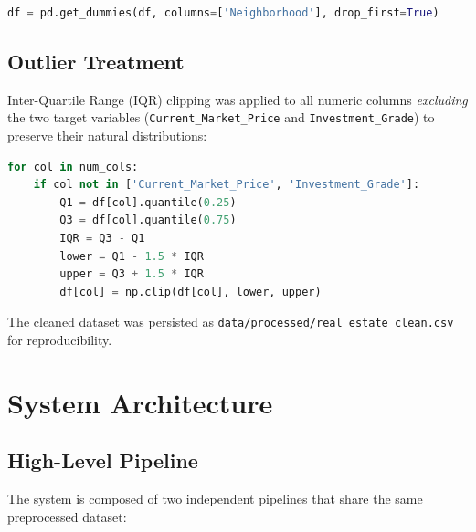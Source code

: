 \documentclass[12pt,a4paper]{article}
\begin{document}
\begin{lstlisting}[language=Python, caption={One-Hot Encoding}]
df = pd.get_dummies(df, columns=['Neighborhood'], drop_first=True)
\end{lstlisting}

\subsection{Outlier Treatment}

Inter-Quartile Range (IQR) clipping was applied to all numeric columns
\textit{excluding} the two target variables (\texttt{Current\_Market\_Price} and
\texttt{Investment\_Grade}) to preserve their natural distributions:

\begin{lstlisting}[language=Python, caption={IQR-Based Outlier Clipping}]
for col in num_cols:
    if col not in ['Current_Market_Price', 'Investment_Grade']:
        Q1 = df[col].quantile(0.25)
        Q3 = df[col].quantile(0.75)
        IQR = Q3 - Q1
        lower = Q1 - 1.5 * IQR
        upper = Q3 + 1.5 * IQR
        df[col] = np.clip(df[col], lower, upper)
\end{lstlisting}

The cleaned dataset was persisted as \texttt{data/processed/real\_estate\_clean.csv} for
reproducibility.

\section{System Architecture}

\subsection{High-Level Pipeline}

The system is composed of two independent pipelines that share the same preprocessed
dataset:
\end{document}
